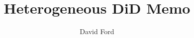 \documentclass[12pt,a4paper]{article}
\begin{document}
\title{Heterogeneous DiD Memo}
\author{David Ford}
\maketitle



\newpage

\begin{center}

\end{center}

\begin{center}

\end{center}



\newpage

\begin{center}

\end{center}

\begin{center}

\end{center}
\end{document}
